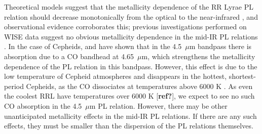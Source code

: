 \documentclass[a4paper,fleqn,usenatbib]{mnras}
\begin{document}


Theoretical models suggest that the metallicity dependence of the RR Lyrae PL relation should decrease monotonically from the optical to the near-infrared \citep{2004ApJS..154..633C, 2001MNRAS.326.1183B}, and observational evidence corroborates this; previous investigations performed on WISE data suggest no obvious metallicity dependence in the mid-IR PL relations \citep{2013ApJ...776..135M}. In the case of Cepheids, \citet{2011ApJ...743...76S} and \citet{2015arXiv150206995S} have shown that in the 4.5~$\mu$m bandpass there is absorption due to a CO bandhead at 4.65~$\mu$m, which strengthens the metallicity dependence of the PL relation in this bandpass. However, this effect is due to the low temperature of Cepheid atmospheres and disappears in the hottest, shortest-period Cepheids, as the CO dissociates at temperatures above 6000 K \citep{2012ApJ...759..146M}. As even the coolest RRL have temperatures over 6000 K [{\bf ref?}], we expect to see no such CO absorption in the 4.5~$\mu$m PL relation. However, there may be other unanticipated metallicity effects in the mid-IR PL relations. If there are any such effects, they must be smaller than the dispersion of the PL relations themselves.
\end{document}
